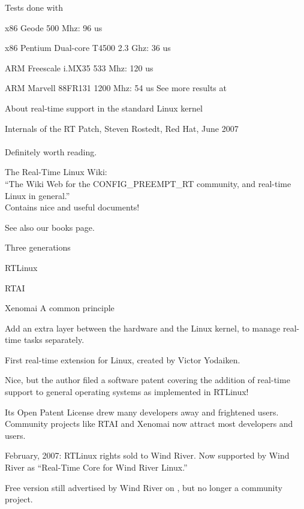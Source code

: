   Tests done with 
  \startitemize
  \item x86 Geode 500 Mhz: 96 us
  \item x86 Pentium Dual-core T4500 2.3 Ghz: 36 us
  \item ARM Freescale i.MX35 533 Mhz: 120 us
  \item ARM Marvell 88FR131 1200 Mhz: 54 us
  \stopitemize
  See more results at

  About real-time support in the standard Linux kernel
  \startitemize
  \item Internals of the RT Patch, Steven Rostedt, Red Hat, June 2007\\
    \\
    Definitely worth reading.
  \item The Real-Time Linux Wiki: \\
    “The Wiki Web for the CONFIG\_PREEMPT\_RT community, and real-time Linux in general.”\\
    Contains nice and useful documents!
  \item See also our books page.
  \stopitemize


    Three generations
    \startitemize
    \item RTLinux
    \item RTAI
    \item Xenomai
    \stopitemize
    A common principle
    \startitemize
    \item Add an extra layer between the hardware and the Linux kernel, to manage
      real-time tasks separately.
    \stopitemize

  First real-time extension for Linux, created by Victor Yodaiken.
  \startitemize
  \item Nice, but the author filed a software patent covering the
    addition of real-time support to general operating systems as
    implemented in RTLinux!
  \item Its Open Patent License drew many developers away and
    frightened users.  Community projects like RTAI and Xenomai now
    attract most developers and users.
  \item February, 2007: RTLinux rights sold to Wind River. Now
    supported by Wind River as “Real-Time Core for Wind River Linux.”
  \item Free version still advertised by Wind River on
    , but no longer a community
    project.
  \stopitemize


